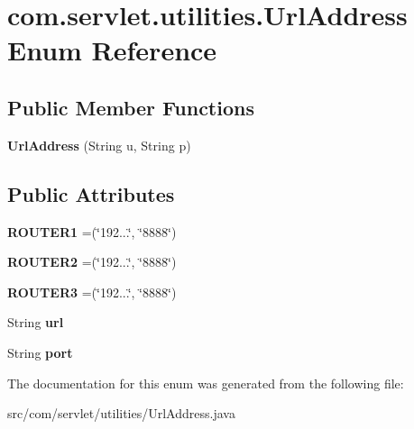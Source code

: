 \hypertarget{enumcom_1_1servlet_1_1utilities_1_1_url_address}{}\section{com.\+servlet.\+utilities.\+Url\+Address Enum Reference}
\label{enumcom_1_1servlet_1_1utilities_1_1_url_address}
\subsection*{Public Member Functions}
\begin{DoxyCompactItemize}
\item 
{\bfseries Url\+Address} (String u, String p)\hypertarget{enumcom_1_1servlet_1_1utilities_1_1_url_address_a3a9045a2757811249e5c3680c5d5a901}{}\label{enumcom_1_1servlet_1_1utilities_1_1_url_address_a3a9045a2757811249e5c3680c5d5a901}

\end{DoxyCompactItemize}
\subsection*{Public Attributes}
\begin{DoxyCompactItemize}
\item 
{\bfseries R\+O\+U\+T\+E\+R1} =(\char`\"{}192...\char`\"{}, \char`\"{}8888\char`\"{})\hypertarget{enumcom_1_1servlet_1_1utilities_1_1_url_address_ae0291161752790dfc3e6afe16ef1c034}{}\label{enumcom_1_1servlet_1_1utilities_1_1_url_address_ae0291161752790dfc3e6afe16ef1c034}

\item 
{\bfseries R\+O\+U\+T\+E\+R2} =(\char`\"{}192...\char`\"{}, \char`\"{}8888\char`\"{})\hypertarget{enumcom_1_1servlet_1_1utilities_1_1_url_address_a52f804f64f7b569725bd31c7ceda8e3a}{}\label{enumcom_1_1servlet_1_1utilities_1_1_url_address_a52f804f64f7b569725bd31c7ceda8e3a}

\item 
{\bfseries R\+O\+U\+T\+E\+R3} =(\char`\"{}192...\char`\"{}, \char`\"{}8888\char`\"{})\hypertarget{enumcom_1_1servlet_1_1utilities_1_1_url_address_a616a08ef12e5ba72c28f0dcce700d3d8}{}\label{enumcom_1_1servlet_1_1utilities_1_1_url_address_a616a08ef12e5ba72c28f0dcce700d3d8}

\item 
String {\bfseries url}\hypertarget{enumcom_1_1servlet_1_1utilities_1_1_url_address_ab01b00ed135a70755c27da2030422e94}{}\label{enumcom_1_1servlet_1_1utilities_1_1_url_address_ab01b00ed135a70755c27da2030422e94}

\item 
String {\bfseries port}\hypertarget{enumcom_1_1servlet_1_1utilities_1_1_url_address_a533987d3d3ab29d88fcbde85e6dc1875}{}\label{enumcom_1_1servlet_1_1utilities_1_1_url_address_a533987d3d3ab29d88fcbde85e6dc1875}

\end{DoxyCompactItemize}


The documentation for this enum was generated from the following file\+:\begin{DoxyCompactItemize}
\item 
src/com/servlet/utilities/Url\+Address.\+java\end{DoxyCompactItemize}
